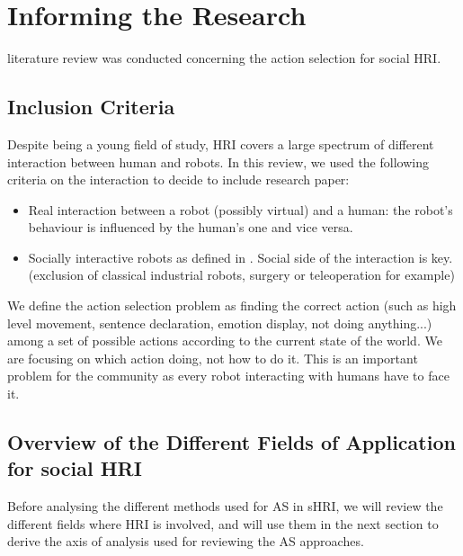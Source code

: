 \chapter{Informing the Research}

literature review was conducted concerning the action selection for social HRI.

\section{Inclusion Criteria}

Despite being a young field of study, HRI covers a large spectrum of different interaction between human and robots. In this review, we used the following criteria on the interaction to decide to include research paper:
\begin{itemize}
\item Real interaction between a robot (possibly virtual) and a human: the robot's behaviour is influenced by the human's one and vice versa.
\item Socially interactive robots as defined in \cite{Fong2003}.  Social side of the interaction is key. (exclusion of classical industrial robots, surgery or teleoperation for example)
\end{itemize}

We define the action selection problem as finding the correct action (such as high level movement, sentence declaration, emotion display, not doing anything...) among a set of possible actions according to the current state of the world. We are focusing on which action doing, not how to do it. This is an important problem for the community as every robot interacting with humans have to face it.


\section{Overview of the Different Fields of Application for social HRI}

Before analysing the different methods used for AS in sHRI, we will review the different fields where HRI is involved, and will use them in the next section to derive the axis of analysis used for reviewing the AS approaches.
	

